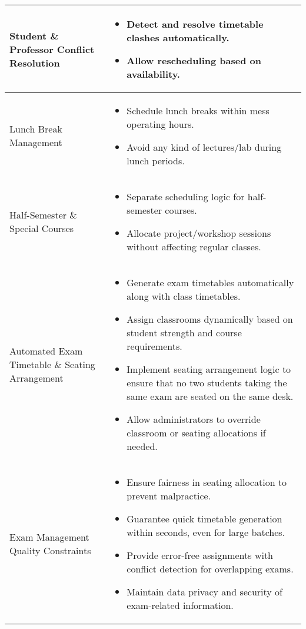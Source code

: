 \documentclass[12pt]{article}
\begin{document}
\begin{longtable}{|p{6cm}|p{8cm}|}
Student \& Professor Conflict Resolution &
\begin{itemize}
    \item Detect and resolve timetable clashes automatically.
    \item Allow rescheduling based on availability.
\end{itemize} \\
\hline

Lunch Break Management &
\begin{itemize}
    \item Schedule lunch breaks within mess operating hours.
    \item Avoid any kind of lectures/lab during lunch periods.
\end{itemize} \\
\hline

Half-Semester \& Special Courses &
\begin{itemize}
    \item Separate scheduling logic for half-semester courses.
    \item Allocate project/workshop sessions without affecting regular classes.
\end{itemize} \\
\hline

Automated Exam Timetable \& Seating Arrangement &
\begin{itemize}
    \item Generate exam timetables automatically along with class timetables.  
    \item Assign classrooms dynamically based on student strength and course requirements.  
    \item Implement seating arrangement logic to ensure that no two students taking the same exam are seated on the same desk.  
    \item Allow administrators to override classroom or seating allocations if needed.  
\end{itemize} \\
\hline

Exam Management Quality Constraints &
\begin{itemize}
    \item Ensure fairness in seating allocation to prevent malpractice.  
    \item Guarantee quick timetable generation within seconds, even for large batches.  
    \item Provide error-free assignments with conflict detection for overlapping exams.  
    \item Maintain data privacy and security of exam-related information.  
\end{itemize} \\
\hline


\end{longtable}
\end{document}
